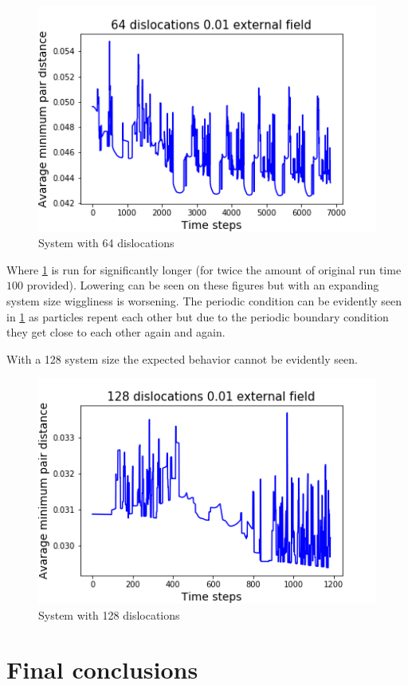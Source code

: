 \documentclass[12pt,a4paper]{article}
\theoremstyle{plain}
\begin{document}
\begin{multicols*}{2}
	\begin{figure}[H]
		\centering
		\includegraphics[width=0.8\columnwidth]{./64_long.png}
		\caption{System with 64 dislocations}
		\label{fig:64}
	\end{figure}

	\par Where \ref{fig:64} is run for significantly longer (for twice the amount of original run time $100$ provided).
	Lowering can be seen on these figures but with an expanding system size wiggliness
	is worsening. The periodic condition can be evidently seen in \ref{fig:64} as particles repent each
	other but due to the periodic boundary condition they get close to each other again and again.

	\par With a 128 system size the expected behavior cannot be evidently seen.

	\begin{figure}[H]
		\centering
		\includegraphics[width=0.8\columnwidth]{./128.png}
		\caption{System with 128 dislocations}
	\end{figure}

	\section{Final conclusions}


\end{multicols*}
\end{document}

